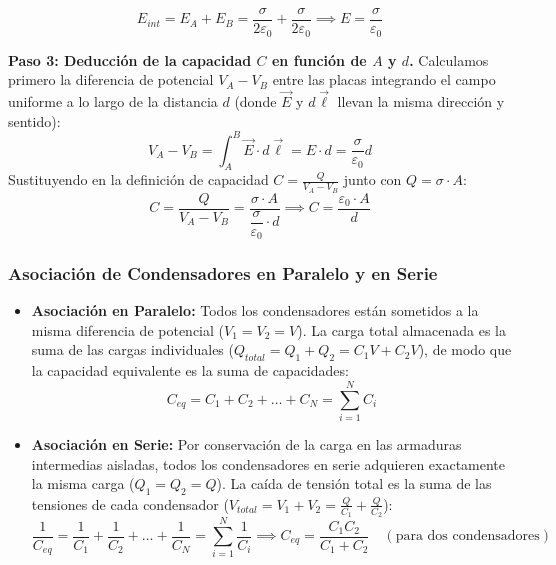\begin{ejercicio}
\begin{itemize}[leftmargin=*]
    \begin{equation}
        E_{int} = E_A + E_B = \frac{\sigma}{2\varepsilon_0} + \frac{\sigma}{2\varepsilon_0} \implies \boxed{E = \frac{\sigma}{\varepsilon_0}}
    \end{equation}
\end{itemize}
\textbf{Paso 3: Deducción de la capacidad $C$ en función de $A$ y $d$.}
Calculamos primero la diferencia de potencial $V_A - V_B$ entre las placas integrando el campo uniforme a lo largo de la distancia $d$ (donde $\vec{E}$ y $d\vec{\ell}$ llevan la misma dirección y sentido):
\begin{equation}
    V_A - V_B = \int_A^B \vec{E} \cdot d\vec{\ell} = E \cdot d = \frac{\sigma}{\varepsilon_0} d
\end{equation}
Sustituyendo en la definición de capacidad $C = \frac{Q}{V_A - V_B}$ junto con $Q = \sigma \cdot A$:
\begin{equation}
    C = \frac{Q}{V_A - V_B} = \frac{\sigma \cdot A}{\dfrac{\sigma}{\varepsilon_0} \cdot d} \implies \boxed{C = \frac{\varepsilon_0 \cdot A}{d}}
\end{equation}
\end{ejercicio}

\subsubsection{Asociación de Condensadores en Paralelo y en Serie}
\begin{itemize}[leftmargin=*]
    \item \textbf{Asociación en Paralelo:} Todos los condensadores están sometidos a la misma diferencia de potencial ($V_1 = V_2 = V$). La carga total almacenada es la suma de las cargas individuales ($Q_{total} = Q_1 + Q_2 = C_1 V + C_2 V$), de modo que la capacidad equivalente es la suma de capacidades:
    \begin{equation}
        C_{eq} = C_1 + C_2 + \dots + C_N = \sum_{i=1}^N C_i
    \end{equation}
    \item \textbf{Asociación en Serie:} Por conservación de la carga en las armaduras intermedias aisladas, todos los condensadores en serie adquieren exactamente la misma carga ($Q_1 = Q_2 = Q$). La caída de tensión total es la suma de las tensiones de cada condensador ($V_{total} = V_1 + V_2 = \frac{Q}{C_1} + \frac{Q}{C_2}$):
    \begin{equation}
        \frac{1}{C_{eq}} = \frac{1}{C_1} + \frac{1}{C_2} + \dots + \frac{1}{C_N} = \sum_{i=1}^N \frac{1}{C_i} \implies C_{eq} = \frac{C_1 C_2}{C_1 + C_2}\quad (\text{para dos condensadores})
    \end{equation}
\end{itemize}

